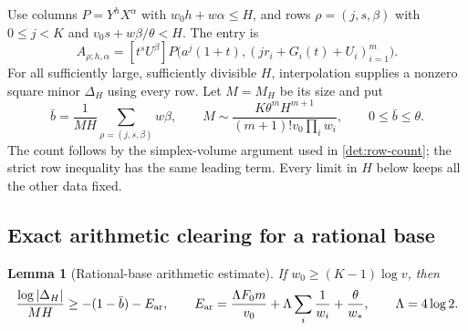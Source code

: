 \documentclass[11pt]{article}
\newtheorem{lemma}[theorem]{Lemma}
\theoremstyle{definition}
\theoremstyle{remark}
\numberwithin{equation}{section}
\begin{document}
Use columns $P=Y^hX^\alpha$ with $w_0h+w\alpha\le H$, and rows
$\rho=(j,s,\beta)$ with
$0\le j<K$ and $v_0s+w\beta/\theta<H$.  The entry is
\begin{equation}
 A_{\rho;h,\alpha}
 =[t^sU^\beta]
 P\bigl(a^j(1+t),(jr_i+G_i(t)+U_i)_{i=1}^m\bigr).
 \label{rat:matrix}
\end{equation}
For all sufficiently large, sufficiently divisible $H$, interpolation
supplies a nonzero square minor $\Delta_H$ using every row.  Let $M=M_H$
be its size and put
\begin{equation}
 \bar b=\frac{1}{MH}\sum_{\rho=(j,s,\beta)}w\beta,
 \qquad
 M\sim\frac{K\theta^mH^{m+1}}
 {(m+1)!v_0\prod_iw_i},\qquad 0\le\bar b\le\theta.
 \label{rat:row-count}
\end{equation}
The count follows by the simplex-volume argument used in
\eqref{det:row-count}; the strict row inequality has the same leading
term.  Every limit in $H$ below keeps all the other data fixed.

\subsection{Exact arithmetic clearing for a rational base}

\begin{lemma}[Rational-base arithmetic estimate]
\label{rat:arithmetic}
If $w_0\ge(K-1)\log v$, then
\begin{equation}
 \frac{\log|\Delta_H|}{MH}\ge-(1-\bar b)-E_{\rm ar},
 \qquad
 E_{\rm ar}=\frac{\Lambda F_0m}{v_0}
  +\Lambda\sum_i\frac1{w_i}+\frac{\theta}{w_*},
 \qquad\Lambda=4\log2.
 \label{rat:lower}
\end{equation}
\end{lemma}
\end{document}
